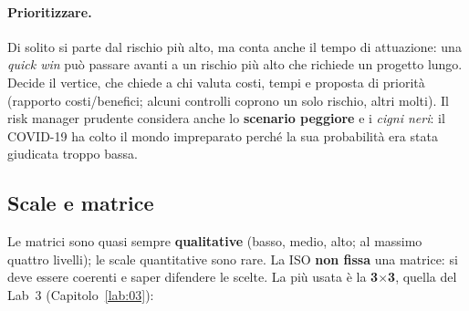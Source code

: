 \paragraph{Prioritizzare.} Di solito si parte dal rischio più alto, ma conta anche il tempo di attuazione:
una \emph{quick win} può passare avanti a un rischio più alto che richiede un progetto lungo. Decide il
vertice, che chiede a chi valuta costi, tempi e proposta di priorità (rapporto costi/benefici; alcuni
controlli coprono un solo rischio, altri molti). Il risk manager prudente considera anche lo
\textbf{scenario peggiore} e i \emph{cigni neri}: il COVID-19 ha colto il mondo impreparato perché la sua
probabilità era stata giudicata troppo bassa.

\subsection{Scale e matrice}
Le matrici sono quasi sempre \textbf{qualitative} (basso, medio, alto; al massimo quattro livelli); le scale
quantitative sono rare. La ISO \textbf{non fissa} una matrice: si deve essere coerenti e saper difendere le
scelte. La più usata è la \textbf{3$\times$3}, quella del Lab~3 (Capitolo~\ref{lab:03}):

\begin{center}
\end{center}

